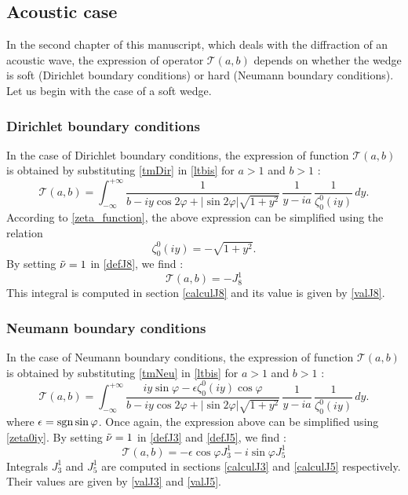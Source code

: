 \subsection{Acoustic case}
\label{finalTac}
In the second chapter of this manuscript, which deals with the diffraction of an acoustic wave, the expression of operator $\mathcal{T}(a,b)$ depends on whether the wedge is soft (Dirichlet boundary conditions) or hard (Neumann boundary conditions). Let us begin with the case of a soft wedge.  
\subsubsection{Dirichlet boundary conditions}
\label{finalTacDir}
In the case of Dirichlet boundary conditions, the expression of function $\mathcal{T}(a,b)$ is obtained by substituting \eqref{tmDir} in \eqref{ltbis} for $a>1$ and $b>1$ :
\begin{equation}
\mathcal{T}(a,b) = \int_{-\infty}^{+\infty} \dfrac{1}{ b - iy \cos 2\varphi  + |\sin 2\varphi| \sqrt{1+y^2}} \, \dfrac{1}{y -i a} \,\dfrac{1}{\zeta_0^0(iy)} \, dy . 
\end{equation}
According to \eqref{zeta_function}, the above expression can be simplified using the relation
\begin{equation}
\zeta_0^0(iy)= - \sqrt{1+y^2}.
\label{zeta0iy}
\end{equation}
By setting $\tilde{\nu}=1$ in \eqref{defJ8}, we find :
\begin{equation}
\mathcal{T}(a,b)=-J_8^1
\end{equation}
This integral is computed in section \ref{calculJ8} and its value is given by \eqref{valJ8}.
\subsubsection{Neumann boundary conditions}
\label{finalTacNeu}
In the case of Neumann boundary conditions, the expression of function $\mathcal{T}(a,b)$ is obtained by substituting \eqref{tmNeu} in \eqref{ltbis} for $a>1$ and $b>1$ :
\begin{equation}
\mathcal{T}(a,b) = \int_{-\infty}^{+\infty} \dfrac{iy\sin\varphi-\epsilon\zeta_0^0(iy)\cos\varphi}{ b - iy \cos 2\varphi  + |\sin 2\varphi| \sqrt{1+y^2}} \, \dfrac{1}{y -i a} \,\dfrac{1}{\zeta_0^0(iy)} \, dy .
\end{equation}
where $\epsilon= \rm sgn \sin\varphi$. Once again, the expression above can be simplified using \eqref{zeta0iy}. By setting $\tilde{\nu}=1$ in \eqref{defJ3} and \eqref{defJ5}, we find :
\begin{equation}
\mathcal{T}(a,b)=-\epsilon\cos\varphi J_3^1-i\sin\varphi J_5^1
\end{equation}
Integrals $J_3^1$ and $J_5^1$ are computed in sections \ref{calculJ3} and \ref{calculJ5} respectively. Their values are given by \eqref{valJ3} and \eqref{valJ5}.

